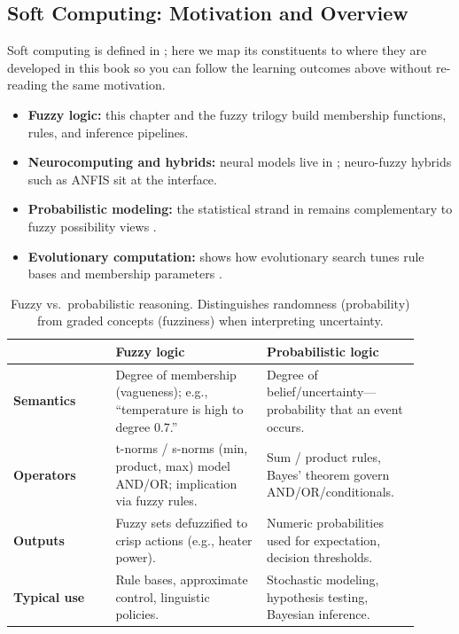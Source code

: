 \subsection{Soft Computing: Motivation and Overview}
\label{sec:softcomp_soft_computing_motivation_and_overview}

Soft computing is defined in ; here we map its constituents to where they are developed in this book so you can follow the learning outcomes above without re-reading the same motivation.
\begin{itemize}
    \item \textbf{Fuzzy logic:} this chapter and the fuzzy trilogy  build membership functions, rules, and inference pipelines.
    \item \textbf{Neurocomputing and hybrids:} neural models live in ; neuro-fuzzy hybrids such as ANFIS \citep{Jang1993} sit at the interface.
    \item \textbf{Probabilistic modeling:} the statistical strand in  remains complementary to fuzzy possibility views \citep{Dubois1988}.
    \item \textbf{Evolutionary computation:}  shows how evolutionary search tunes rule bases and membership parameters \citep{Herrera2008,Ishibuchi2007}.
\end{itemize}


\begin{table}[t]
\centering
\caption{Fuzzy vs.\ probabilistic reasoning. Distinguishes randomness (probability) from graded concepts (fuzziness) when interpreting uncertainty.}
\label{tab:fuzzy-vs-prob}
\small
\begin{tabular}{@{}p{0.23\linewidth} >{\raggedright\arraybackslash}p{0.34\linewidth} >{\raggedright\arraybackslash}p{0.34\linewidth}@{}}
\toprule
 & \textbf{Fuzzy logic} & \textbf{Probabilistic logic} \\
\midrule
\textbf{Semantics} & Degree of membership (vagueness); e.g., ``temperature is high to degree 0.7.'' & Degree of belief/uncertainty---probability that an event occurs. \\
\textbf{Operators} & t\hyp{}norms / s\hyp{}norms (min, product, max) model AND/OR; implication via fuzzy rules. & Sum / product rules, Bayes' theorem govern AND/OR/conditionals. \\
\textbf{Outputs} & Fuzzy sets defuzzified to crisp actions (e.g., heater power). & Numeric probabilities used for expectation, decision thresholds. \\
\textbf{Typical use} & Rule bases, approximate control, linguistic policies. & Stochastic modeling, hypothesis testing, Bayesian inference. \\
\bottomrule
\end{tabular}
\end{table}


